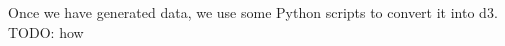 \label{sec:vis-system}

Once we have generated data, we use some Python scripts to convert it into 
d3. TODO: how

